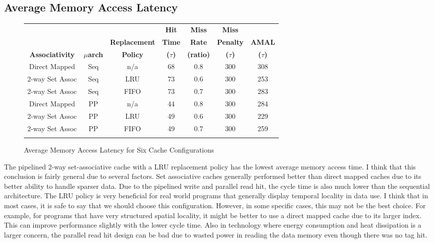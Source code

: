 \documentclass[10pt]{article}
\begin{document}
\subsection{Average Memory Access Latency}
\begin{figure}[H]
\centering
\begin{tabular}{@{\extracolsep{3pt}}ccccccc@{}}
\Xhline{2\arrayrulewidth}
& & & \textbf{Hit} & \textbf{Miss} & \textbf{Miss} & \\
& & \textbf{Replacement} & \textbf{Time} & \textbf{Rate} & \textbf{Penalty} & \textbf{AMAL} \\
\textbf{Associativity} & \textbf{$\mu$arch} & \textbf{Policy} & \textbf{($\tau$)} & \textbf{(ratio)} & \textbf{($\tau$)} & \textbf{($\tau$)} \\
\Xhline{2\arrayrulewidth}
Direct Mapped   & Seq & n/a & 68 & 0.8 & 300 & 308\\
2-way Set Assoc & Seq & LRU & 73 & 0.6 & 300 & 253\\
2-way Set Assoc & Seq & FIFO& 73 & 0.7 & 300 & 283\\
Direct Mapped   & PP  & n/a & 44 & 0.8 & 300 & 284\\
2-way Set Assoc & PP  & LRU & 49 & 0.6 & 300 & 229\\
2-way Set Assoc & PP  & FIFO& 49 & 0.7 & 300 & 259\\
\Xhline{2\arrayrulewidth}
\end{tabular}
\caption{Average Memory Access Latency for Six Cache Configurations}
\end{figure}
The pipelined 2-way set-associative cache with a LRU replacement policy has the lowest average memory access time. I think that this conclusion is fairly general due to several factors. Set associative caches generally performed better than direct mapped caches due to its better ability to handle sparser data. Due to the pipelined write and parallel read hit, the cycle time is also much lower than the sequential architecture. The LRU policy is very beneficial for real world programs that generally display temporal locality in data use. I think that in most cases, it is safe to say that we should choose this configuration. However, in some specific cases, this may not be the best choice. For example, for programs that have very structured spatial locality, it might be better to use a direct mapped cache due to its larger index. This can improve performance slightly with the lower cycle time. Also in technology where energy consumption and heat dissipation is a larger concern, the parallel read hit design can be bad due to wasted power in reading the data memory even though there was no tag hit. 
\end{document}
